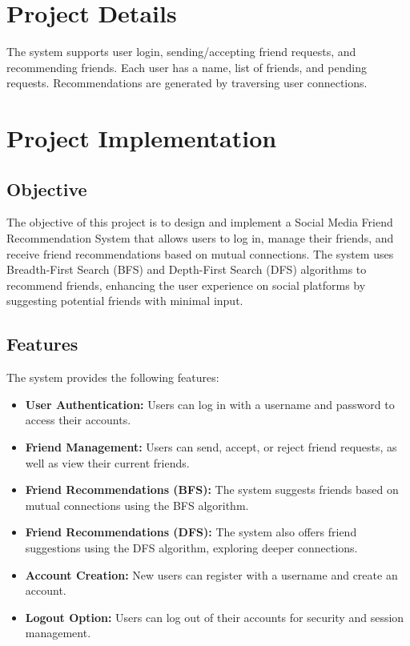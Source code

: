 \documentclass[12pt]{report}
\begin{document}
\section{Project Details}
The system supports user login, sending/accepting friend requests, and recommending
friends. Each user has a name, list of friends, and pending requests. Recommendations
are generated by traversing user connections.
\section{Project Implementation}

\subsection{Objective}
The objective of this project is to design and implement a Social Media Friend Recommendation System that allows users to log in, manage their friends, and receive friend recommendations based on mutual connections. The system uses Breadth-First Search (BFS) and Depth-First Search (DFS) algorithms to recommend friends, enhancing the user experience on social platforms by suggesting potential friends with minimal input.

\subsection{Features}
The system provides the following features:
\begin{itemize}
    \item \textbf{User Authentication:} Users can log in with a username and password to access their accounts.
    \item \textbf{Friend Management:} Users can send, accept, or reject friend requests, as well as view their current friends.
    \item \textbf{Friend Recommendations (BFS):} The system suggests friends based on mutual connections using the BFS algorithm.
    \item \textbf{Friend Recommendations (DFS):} The system also offers friend suggestions using the DFS algorithm, exploring deeper connections.
    \item \textbf{Account Creation:} New users can register with a username and create an account.
    \item \textbf{Logout Option:} Users can log out of their accounts for security and session management.
\end{itemize}
\end{document}
